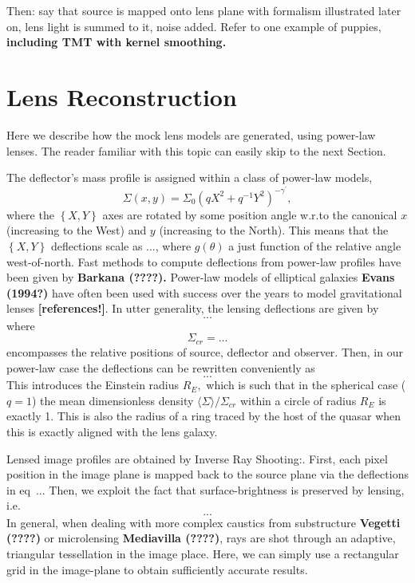 \documentclass[a4paper,11pt]{article}
\begin{document}
Then: say that source is mapped onto lens plane with formalism illustrated later on, lens light is summed to it, noise added. Refer to one example of puppies, \textbf{including TMT with kernel smoothing.}

\section{Lens Reconstruction}
Here we describe how the mock lens models are generated, using power-law lenses. The reader familiar with this topic can easily skip to the next Section.

The deflector's mass profile is assigned within a class of power-law models,
\begin{equation}
\Sigma(x,y)=\Sigma_{0}(q X^{2}+q^{-1}Y^{2})^{-\gamma^{\prime}},
\end{equation}
where the $\left\{X,Y\right\}$ axes are rotated by some position angle w.r.to the canonical $x$ (increasing to the West) and $y$ (increasing to the North). This means that the $\left\{X,Y\right\}$ deflections scale as ..., where $g(\theta)$ a just function of the relative angle west-of-north. Fast methods to compute deflections from power-law profiles have been given by \textbf{Barkana (????).} Power-law models of elliptical galaxies \textbf{Evans (1994?)} have often been used with success over the years to model gravitational lenses \textbf{[references!]}.
In utter generality, the lensing deflections are given by
\begin{equation}
...
\end{equation}
where
\begin{equation}
\Sigma_{cr}=...
\end{equation}
encompasses the relative positions of source, deflector and observer. Then, in our power-law case the deflections can be rewritten conveniently as
\begin{equation}
...
\end{equation}
This introduces the Einstein radius $R_E,$ which is such that in the spherical case ($q=1$) the mean dimensionless density $\langle\Sigma\rangle/\Sigma_{cr}$ within a circle of radius $R_E$ is exactly 1. This is also the radius of a ring traced by the host of the quasar when this is exactly aligned with the lens galaxy.

Lensed image profiles are obtained by Inverse Ray Shooting:. First, each pixel position in the image plane is mapped back to the source plane via the deflections in eq~... Then, we exploit the fact that surface-brightness is preserved by lensing, i.e.
\begin{equation}
...
\end{equation}
In general, when dealing with more complex caustics from substructure \textbf{Vegetti (????)} or microlensing \textbf{Mediavilla (????)},
 rays are shot through an adaptive, triangular tessellation in the image place.
 Here, we can simply use a rectangular grid in the image-plane to obtain sufficiently accurate results.
\end{document}
